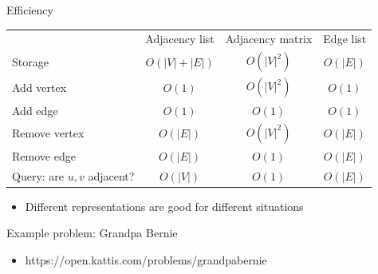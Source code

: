 \documentclass[10pt]{beamer}
\newcommand{\bi}{\begin{itemize}}
\newcommand{\ei}{\end{itemize}}
\begin{document}
\begin{frame}{Efficiency}

    \vspace{20pt}

    {
        \scriptsize
    \begin{center}
        \begin{tabular}{lccc}
            & Adjacency list & Adjacency matrix & Edge list \\
            Storage & $O(|V| + |E|)$ & $O(|V|^2)$ & $O(|E|)$ \\
            Add vertex & $O(1)$ & $O(|V|^2)$ & $O(1)$ \\
            Add edge & $O(1)$ & $O(1)$ & $O(1)$ \\
            Remove vertex & $O(|E|)$ & $O(|V|^2)$ & $O(|E|)$ \\
            Remove edge & $O(|E|)$ & $O(1)$ & $O(|E|)$ \\
            Query: are $u,v$ adjacent? & $O(|V|)$ & $O(1)$ & $O(|E|)$ \\
        \end{tabular}
    \end{center}
    }

    \bi
        \item Different representations are good for different situations
    \ei
\end{frame}

\begin{frame}{Example problem: Grandpa Bernie}
    \bi
        \item https://open.kattis.com/problems/grandpabernie
    \ei
\end{frame}
\end{document}
